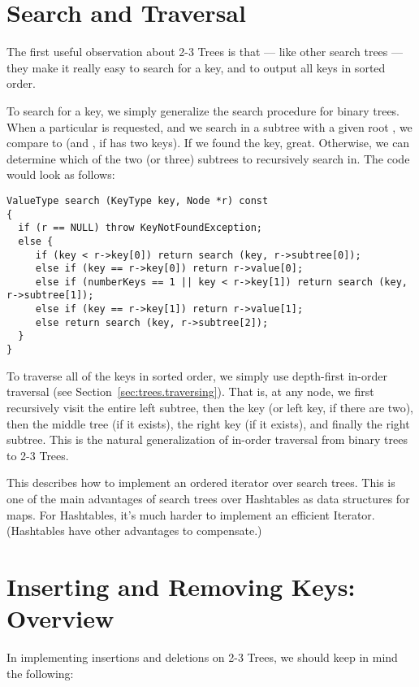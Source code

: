 \section{Search and Traversal}
The first useful observation about 2-3 Trees is that --- like other
search trees --- they make it really easy to search for a key, and to 
output all keys in sorted order. 

To search for a key, we simply generalize the search procedure for
binary trees. 
When a particular  is requested, and we search in a subtree
with a given root , we compare 
to  (and , if  has two keys).
If we found the key, great. Otherwise, we can determine which of the
two (or three) subtrees to recursively search in.
The code would look as follows:

\begin{verbatim}
ValueType search (KeyType key, Node *r) const
{
  if (r == NULL) throw KeyNotFoundException;
  else {
     if (key < r->key[0]) return search (key, r->subtree[0]);
     else if (key == r->key[0]) return r->value[0];
     else if (numberKeys == 1 || key < r->key[1]) return search (key, r->subtree[1]);
     else if (key == r->key[1]) return r->value[1];
     else return search (key, r->subtree[2]);
  }
}
\end{verbatim}

To traverse all of the keys in sorted order, 
we simply use depth-first in-order traversal (see Section~\ref{sec:trees.traversing}).
That is, at any node, we first recursively visit the entire
left subtree, then the key (or left key, if there are two), then the
middle tree (if it exists), the right key (if it exists), and finally
the right subtree. This is the natural generalization of in-order
traversal from binary trees to 2-3 Trees.

This describes how to implement an ordered iterator over search
trees. This is one of the main advantages of search trees over
Hashtables as data structures for maps. For Hashtables, it's
much harder to implement an efficient Iterator. 
(Hashtables have other advantages to compensate.)

\section{Inserting and Removing Keys: Overview}
In implementing insertions and deletions on 2-3 Trees, we should keep
in mind the following:

